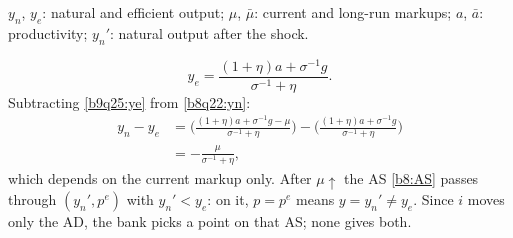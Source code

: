 \begin{sol}
\begin{notacao}
\item $y_n$, $y_e$: natural and efficient output; $\mu$, $\bar\mu$: current and long-run markups; $a$, $\bar a$: productivity; $y_n'$: natural output after the shock.
\end{notacao}
\begin{equation}
y_e=\frac{(1+\eta)a+\sigma^{-1}g}{\sigma^{-1}+\eta}. \label{b9q25:ye}
\end{equation}
Subtracting \eqref{b9q25:ye} from \eqref{b8q22:yn}:
\begin{align}
y_n-y_e&=\Big(\frac{(1+\eta)a+\sigma^{-1}g-\mu}{\sigma^{-1}+\eta}\Big)-\Big(\frac{(1+\eta)a+\sigma^{-1}g}{\sigma^{-1}+\eta}\Big)\nonumber\\
&=-\frac{\mu}{\sigma^{-1}+\eta}, \label{b9q25:gap}
\end{align}
which depends on the current markup only. After $\mu\uparrow$ the AS \eqref{b8:AS} passes through $(y_n',p^e)$ with $y_n'<y_e$:
on it, $p=p^e$ means $y=y_n'\neq y_e$. Since $i$ moves only the AD, the bank picks a point on that AS; none gives both.
\end{sol}

